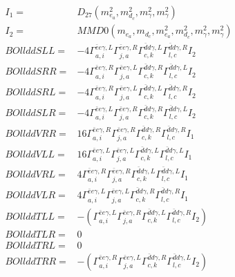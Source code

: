 \documentclass[A4,landscape]{article}
\begin{document}
\begin{align} 
I_1 = & D_{27}(m^2_{e_{{a}}}, m^2_{d_{{c}}}, m^2_{\gamma}, m^2_{\gamma}) \\ 
I_2 = & MMD0(m_{e_{{a}}}, m_{d_{{c}}}, m^2_{e_{{a}}}, m^2_{d_{{c}}}, m^2_{\gamma}, m^2_{\gamma}) \\ 
  BOllddSLL= & -4  \Gamma^{\bar{e}e \gamma ,L}_{a, i} \Gamma^{\bar{e}e \gamma ,R}_{j, a} \Gamma^{\bar{d}d \gamma ,L}_{c, k} \Gamma^{\bar{d}d \gamma ,R}_{l, c} I_2 \\ 
  BOllddSRR= & -4  \Gamma^{\bar{e}e \gamma ,R}_{a, i} \Gamma^{\bar{e}e \gamma ,L}_{j, a} \Gamma^{\bar{d}d \gamma ,R}_{c, k} \Gamma^{\bar{d}d \gamma ,L}_{l, c} I_2 \\ 
  BOllddSRL= & -4  \Gamma^{\bar{e}e \gamma ,R}_{a, i} \Gamma^{\bar{e}e \gamma ,L}_{j, a} \Gamma^{\bar{d}d \gamma ,L}_{c, k} \Gamma^{\bar{d}d \gamma ,R}_{l, c} I_2 \\ 
  BOllddSLR= & -4  \Gamma^{\bar{e}e \gamma ,L}_{a, i} \Gamma^{\bar{e}e \gamma ,R}_{j, a} \Gamma^{\bar{d}d \gamma ,R}_{c, k} \Gamma^{\bar{d}d \gamma ,L}_{l, c} I_2 \\ 
  BOllddVRR= & 16  \Gamma^{\bar{e}e \gamma ,R}_{a, i} \Gamma^{\bar{e}e \gamma ,R}_{j, a} \Gamma^{\bar{d}d \gamma ,R}_{c, k} \Gamma^{\bar{d}d \gamma ,R}_{l, c} I_1 \\ 
  BOllddVLL= & 16  \Gamma^{\bar{e}e \gamma ,L}_{a, i} \Gamma^{\bar{e}e \gamma ,L}_{j, a} \Gamma^{\bar{d}d \gamma ,L}_{c, k} \Gamma^{\bar{d}d \gamma ,L}_{l, c} I_1 \\ 
  BOllddVRL= & 4  \Gamma^{\bar{e}e \gamma ,R}_{a, i} \Gamma^{\bar{e}e \gamma ,R}_{j, a} \Gamma^{\bar{d}d \gamma ,L}_{c, k} \Gamma^{\bar{d}d \gamma ,L}_{l, c} I_1 \\ 
  BOllddVLR= & 4  \Gamma^{\bar{e}e \gamma ,L}_{a, i} \Gamma^{\bar{e}e \gamma ,L}_{j, a} \Gamma^{\bar{d}d \gamma ,R}_{c, k} \Gamma^{\bar{d}d \gamma ,R}_{l, c} I_1 \\ 
  BOllddTLL= & -( \Gamma^{\bar{e}e \gamma ,L}_{a, i} \Gamma^{\bar{e}e \gamma ,R}_{j, a} \Gamma^{\bar{d}d \gamma ,L}_{c, k} \Gamma^{\bar{d}d \gamma ,R}_{l, c} I_2) \\ 
  BOllddTLR= & 0 \\ 
  BOllddTRL= & 0 \\ 
  BOllddTRR= & -( \Gamma^{\bar{e}e \gamma ,R}_{a, i} \Gamma^{\bar{e}e \gamma ,L}_{j, a} \Gamma^{\bar{d}d \gamma ,R}_{c, k} \Gamma^{\bar{d}d \gamma ,L}_{l, c} I_2) \\ 
\end{align} 
\end{document}
